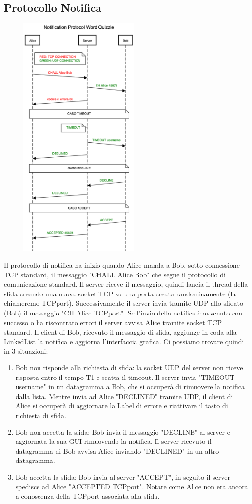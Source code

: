 \documentclass{article}
\begin{document}
\subsection{Protocollo Notifica}
\begin{figure}
\centering
\includegraphics[width=6cm]{chprotocolscheme.png}
\end{figure}
Il protocollo di notifica ha inizio quando Alice manda a Bob, sotto connessione TCP standard, il messaggio "CHALL Alice Bob" che segue il protocollo di comunicazione standard. Il server riceve il messaggio, quindi lancia il thread della sfida creando una nuova socket TCP su una porta creata randomicamente (la chiameremo TCPport). Successivamente il server invia tramite UDP allo sfidato (Bob) il messaggio "CH Alice TCPport". Se l'invio della notifica è avvenuto con successo o ha riscontrato errori il server avvisa Alice tramite socket TCP standard. Il client di Bob, ricevuto il messaggio di sfida, aggiunge in coda alla LinkedList la notifica e aggiorna l'interfaccia grafica.
Ci possiamo trovare quindi in 3 situazioni:
\begin{enumerate}
  \item Bob non risponde alla richiesta di sfida: la socket UDP del server non riceve risposta entro il tempo T1 e scatta il timeout. Il server invia "TIMEOUT username" in un datagramma a Bob, che si occuperà di rimuovere la notifica dalla lista. Mentre invia ad Alice "DECLINED" tramite UDP, il client di Alice si occuperà di aggiornare la Label di errore e riattivare il tasto di richiesta di sfida.
  \item Bob non accetta la sfida: Bob invia il messaggio "DECLINE" al server e aggiornata la sua GUI rimuovendo la notifica. Il server ricevuto il datagramma di Bob avvisa Alice inviando "DECLINED" in un altro datagramma.
  \item Bob accetta la sfida: Bob invia al server "ACCEPT", in seguito il server spedisce ad Alice "ACCEPTED TCPport". Notare come Alice non era ancora a conoscenza della TCPport associata alla sfida.
\end{enumerate}
\end{document}
